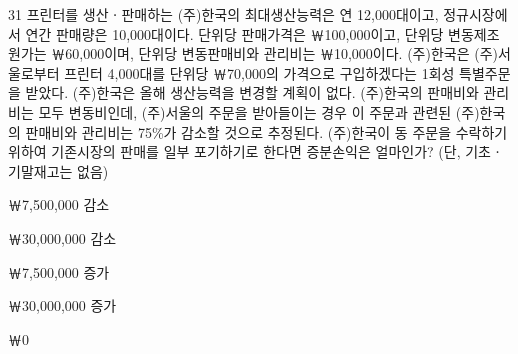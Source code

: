 \begin{question}{31}
프린터를 생산ㆍ판매하는 (주)한국의 최대생산능력은 연 12,000대이고, 정규시장에서 연간 판매량은 10,000대이다. 단위당 판매가격은 ￦100,000이고, 단위당 변동제조원가는 ￦60,000이며, 단위당 변동판매비와 관리비는 ￦10,000이다. (주)한국은 (주)서울로부터 프린터 4,000대를 단위당 ￦70,000의 가격으로 구입하겠다는 1회성 특별주문을 받았다. (주)한국은 올해 생산능력을 변경할 계획이 없다. (주)한국의 판매비와 관리비는 모두 변동비인데, (주)서울의 주문을 받아들이는 경우 이 주문과 관련된 (주)한국의 판매비와 관리비는 75\%가 감소할 것으로 추정된다. (주)한국이 동 주문을 수락하기 위하여 기존시장의 판매를 일부 포기하기로 한다면 증분손익은 얼마인가? (단, 기초ㆍ기말재고는 없음)
\begin{choices}
  \item ￦7,500,000 감소
  \item ￦30,000,000 감소
  \item ￦7,500,000 증가
  \item ￦30,000,000 증가
  \item ￦0
\end{choices}
\end{question}
